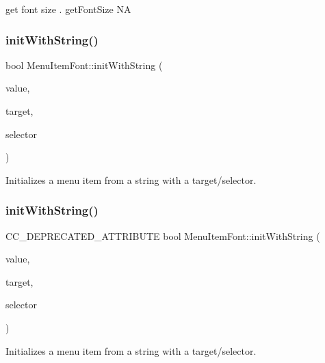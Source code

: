 get font size .  get\+Font\+Size  NA \mbox{\label{classMenuItemFont_abb6d2b844564ef2f1f234771332600a4}} 
\subsubsection{\texorpdfstring{init\+With\+String()}{initWithString()}\hspace{0.1cm}{\footnotesize\ttfamily [1/4]}}
{\footnotesize\ttfamily bool Menu\+Item\+Font\+::init\+With\+String (\begin{DoxyParamCaption}\item[{const std\+::string \&}]{value,  }\item[{\hyperlink{classRef}{Ref} $\ast$}]{target,  }\item[{S\+E\+L\+\_\+\+Menu\+Handler}]{selector }\end{DoxyParamCaption})}

Initializes a menu item from a string with a target/selector. \mbox{\label{classMenuItemFont_abeedcee69a16a6256ac410fcd3c80028}} 
\subsubsection{\texorpdfstring{init\+With\+String()}{initWithString()}\hspace{0.1cm}{\footnotesize\ttfamily [2/4]}}
{\footnotesize\ttfamily C\+C\+\_\+\+D\+E\+P\+R\+E\+C\+A\+T\+E\+D\+\_\+\+A\+T\+T\+R\+I\+B\+U\+TE bool Menu\+Item\+Font\+::init\+With\+String (\begin{DoxyParamCaption}\item[{const std\+::string \&}]{value,  }\item[{\hyperlink{classRef}{Ref} $\ast$}]{target,  }\item[{S\+E\+L\+\_\+\+Menu\+Handler}]{selector }\end{DoxyParamCaption})}

Initializes a menu item from a string with a target/selector. \mbox{\label{classMenuItemFont_adcc053518d3c01691ed13798055188e8}} 
